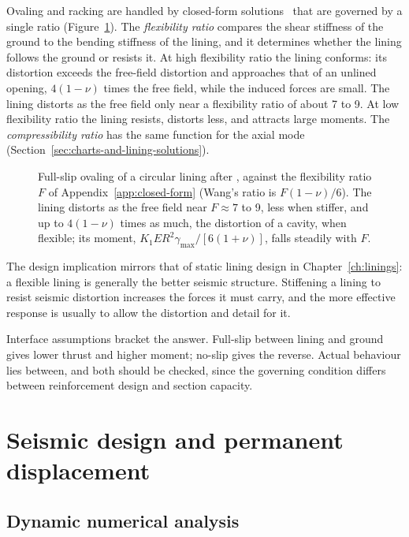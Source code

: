 Ovaling and racking are handled by closed-form
solutions~\citep{wang1993seismic,penzien2000seismically} that are governed
by a single ratio (Figure~\ref{fig:ovaling-flexibility}). The \emph{flexibility ratio} compares the shear stiffness
of the ground to the bending stiffness of the lining, and it determines
whether the lining follows the ground or resists it. At high flexibility ratio
the lining conforms: its distortion exceeds the free-field distortion and
approaches that of an unlined opening, $4(1-\nu)$ times the free field, while
the induced forces are small. The lining distorts as the free field only near
a flexibility ratio of about 7 to 9. At low flexibility ratio the lining
resists, distorts less, and attracts large moments. The \emph{compressibility ratio} has the
same function for the axial mode (Section~\ref{sec:charts-and-lining-solutions}).

\begin{figure}[htbp]
\centering
{}
\caption{Full-slip ovaling of a circular lining after \citet{wang1993seismic}, against the flexibility ratio $F$ of Appendix~\ref{app:closed-form} (Wang's ratio is $F(1-\nu)/6$). The lining distorts as the free field near $F \approx 7$ to 9, less when stiffer, and up to $4(1-\nu)$ times as much, the distortion of a cavity, when flexible; its moment, $K_1 E R^2 \gamma_{\max}/[6(1+\nu)]$, falls steadily with $F$.}
\label{fig:ovaling-flexibility}
\end{figure}

The design implication mirrors that of static lining design in
Chapter~\ref{ch:linings}: a flexible lining is generally the better seismic
structure. Stiffening a lining to resist seismic distortion increases the
forces it must carry, and the more effective response is usually to allow the
distortion and detail for it.

Interface assumptions bracket the answer. Full-slip between lining and ground
gives lower thrust and higher moment; no-slip gives the reverse. Actual behaviour lies between, and both should be checked, since the governing
condition differs between reinforcement design and section capacity.

\section{Seismic design and permanent displacement}
\label{sec:seismic-design-displacement}

\subsection{Dynamic numerical analysis}
\label{sec:dynamic-analysis}

